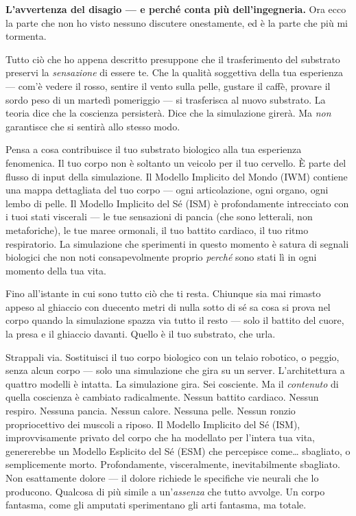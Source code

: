 \documentclass[11pt, twoside, openright]{book}
\begin{document}
\textbf{L'avvertenza del disagio --- e perché conta più dell'ingegneria.} Ora ecco la parte che non ho visto nessuno discutere onestamente, ed è la parte che più mi tormenta.

Tutto ciò che ho appena descritto presuppone che il trasferimento del substrato preservi la \textit{sensazione} di essere te. Che la qualità soggettiva della tua esperienza --- com'è vedere il rosso, sentire il vento sulla pelle, gustare il caffè, provare il sordo peso di un martedì pomeriggio --- si trasferisca al nuovo substrato. La teoria dice che la coscienza persisterà. Dice che la simulazione girerà. Ma \textit{non} garantisce che si sentirà allo stesso modo.

Pensa a cosa contribuisce il tuo substrato biologico alla tua esperienza fenomenica. Il tuo corpo non è soltanto un veicolo per il tuo cervello. È parte del flusso di input della simulazione. Il Modello Implicito del Mondo (IWM) contiene una mappa dettagliata del tuo corpo --- ogni articolazione, ogni organo, ogni lembo di pelle. Il Modello Implicito del Sé (ISM) è profondamente intrecciato con i tuoi stati viscerali --- le tue sensazioni di pancia (che sono letterali, non metaforiche), le tue maree ormonali, il tuo battito cardiaco, il tuo ritmo respiratorio. La simulazione che sperimenti in questo momento è satura di segnali biologici che non noti consapevolmente proprio \textit{perché} sono stati lì in ogni momento della tua vita.

Fino all'istante in cui sono tutto ciò che ti resta. Chiunque sia mai rimasto appeso al ghiaccio con duecento metri di nulla sotto di sé sa cosa si prova nel corpo quando la simulazione spazza via tutto il resto --- solo il battito del cuore, la presa e il ghiaccio davanti. Quello è il tuo substrato, che urla.

Strappali via. Sostituisci il tuo corpo biologico con un telaio robotico, o peggio, senza alcun corpo --- solo una simulazione che gira su un server. L'architettura a quattro modelli è intatta. La simulazione gira. Sei cosciente. Ma il \textit{contenuto} di quella coscienza è cambiato radicalmente. Nessun battito cardiaco. Nessun respiro. Nessuna pancia. Nessun calore. Nessuna pelle. Nessun ronzio propriocettivo dei muscoli a riposo. Il Modello Implicito del Sé (ISM), improvvisamente privato del corpo che ha modellato per l'intera tua vita, genererebbe un Modello Esplicito del Sé (ESM) che percepisce come\ldots{} sbagliato, o semplicemente morto. Profondamente, visceralmente, inevitabilmente sbagliato. Non esattamente dolore --- il dolore richiede le specifiche vie neurali che lo producono. Qualcosa di più simile a un'\textit{assenza} che tutto avvolge. Un corpo fantasma, come gli amputati sperimentano gli arti fantasma, ma totale.
\end{document}
